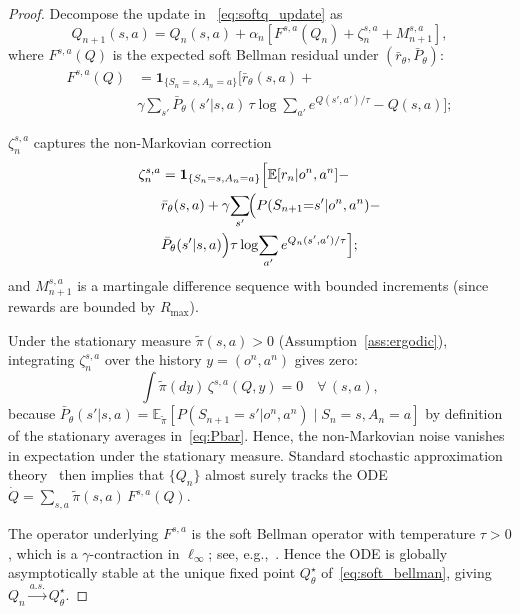 \documentclass[12pt]{article}
\renewcommand{\[}{\left[}
\renewcommand{\]}{\right]}
\renewcommand{\(}{\left(}
\renewcommand{\)}{\right)}
\newcounter{l1}
\newcounter{l2}
\newcounter{l3}
\renewcommand{\tilde}{\widetilde}
\newcommand{\Rmax}{R_{\max}}
\begin{document}
\begin{proof}
Decompose the update in ~\eqref{eq:softq_update} as
\begin{equation*}
  Q_{n+1}(s,a)
  = Q_n(s,a) + \alpha_n\!
    \left[F^{s,a}(Q_n) + \zeta^{s,a}_n + M^{s,a}_{n+1}\right],
\end{equation*}
where $F^{s,a}(Q)$ is the expected soft Bellman residual under
$(\bar{r}_\theta, \bar{P}_\theta)$:
\begin{align*}
     F^{s,a}(Q)
  &= \mathbf{1}_{\{S_n=s,A_n=a\}}
    \!\Big[
      \bar{r}_\theta(s,a)
      +\\ &\gamma\sum_{s'}\bar{P}_\theta(s'|s,a)\,\tau\log\!\sum_{a'}e^{Q(s',a')/\tau}
      - Q(s,a)
    \Big]; 
\end{align*}

$\zeta^{s,a}_n$ captures the non-Markovian correction
\begin{align*}
    \zeta^{s,a}_n
  &= \mathbf{1}_{\{S_n=s,A_n=a\}}
    \Big[
      \mathbb{E}[r_n | o^n, a^n] -\\
      & \bar{r}_\theta(s,a)
      + \gamma\!\sum_{s'}\!
        \Bigl(P(S_{n+1}{=}s'|o^n,a^n)
          - \\
          &\bar{P}_\theta(s'|s,a)\Bigr)
        \tau\log\!\sum_{a'}e^{Q_n(s',a')/\tau}
    \Big];
\end{align*}
and $M^{s,a}_{n+1}$ is a martingale difference sequence with bounded increments (since
rewards are bounded by $\Rmax$).

Under the stationary measure $\tilde\pi(s,a) > 0$
(Assumption~\ref{ass:ergodic}), integrating $\zeta^{s,a}_n$ over the history $y=(o^n,a^n)$
gives zero:
\begin{equation*}
  \int \tilde\pi(dy)\,\zeta^{s,a}(Q,y) = 0
  \quad \forall\,(s,a),
\end{equation*}
because $\bar{P}_\theta(s'|s,a)
= \mathbb{E}_{\tilde\pi}[P(S_{n+1}{=}s'|o^n,a^n) \mid S_n{=}s, A_n{=}a]$
by definition of the stationary averages in~\eqref{eq:Pbar}.
Hence, the non-Markovian noise vanishes in expectation under the stationary measure.
Standard stochastic approximation theory~\cite{borkar2008stochastic} then implies that
$\{Q_n\}$ almost surely tracks the ODE
$\dot Q = \sum_{s,a}\tilde\pi(s,a)\,F^{s,a}(Q)$.

The operator underlying $F^{s,a}$ is the soft Bellman operator with temperature $\tau>0$,
which is a $\gamma$-contraction in $\ell_\infty$; see, e.g.,~\cite{haarnoja2018soft}.
Hence the ODE is globally asymptotically stable at the unique fixed point $Q^\star_\theta$
of~\eqref{eq:soft_bellman}, giving $Q_n \xrightarrow{a.s.} Q^\star_\theta$.
\end{proof}
\end{document}
